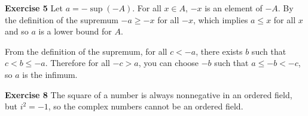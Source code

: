 \documentclass{article}
\begin{document}
    \textbf{Exercise 5}
    Let $a = -\sup(-A)$.
    For all $x\in A$, $-x$ is an element of $-A$.
    By the definition of the supremum $-a \geq -x$ for all $-x$,
    which implies $a \leq x$ for all $x$ and so $a$ is a lower bound for $A$.

    From the definition of the supremum, for all $c < -a$, there exists 
    $b$ such that $c < b \leq -a$.
    Therefore for all $-c > a$, you can choose 
    $-b$ such that  $a \leq -b < -c$, so $a$ is the infimum.

    \textbf{Exercise 8}
    The square of a number is always nonnegative in an ordered field,
    but $i^2 = -1$, so the complex numbers cannot be an ordered field.





\newpage
\end{document}
